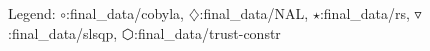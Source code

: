 Legend: {\color{NavyBlue}$\circ$}:final\_data/cobyla, {\color{Magenta}$\diamondsuit$}:final\_data/NAL, {\color{Orange}$\star$}:final\_data/rs, {\color{CornflowerBlue}$\triangledown$}:final\_data/slsqp, {\color{red}$\varhexagon$}:final\_data/trust-constr
